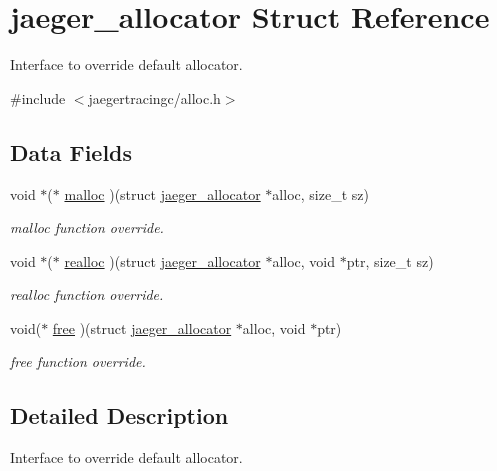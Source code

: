 \hypertarget{structjaeger__allocator}{}\section{jaeger\+\_\+allocator Struct Reference}
\label{structjaeger__allocator}


Interface to override default allocator.  




{\ttfamily \#include $<$jaegertracingc/alloc.\+h$>$}

\subsection*{Data Fields}
\begin{DoxyCompactItemize}
\item 
void $\ast$($\ast$ \mbox{\hyperlink{structjaeger__allocator_a235caded5cb561736c69c28b47169864}{malloc}} )(struct \mbox{\hyperlink{structjaeger__allocator}{jaeger\+\_\+allocator}} $\ast$alloc, size\+\_\+t sz)
\begin{DoxyCompactList}\small\item\em malloc function override. \end{DoxyCompactList}\item 
void $\ast$($\ast$ \mbox{\hyperlink{structjaeger__allocator_a17a8373babb00b98a1303cafaf524676}{realloc}} )(struct \mbox{\hyperlink{structjaeger__allocator}{jaeger\+\_\+allocator}} $\ast$alloc, void $\ast$ptr, size\+\_\+t sz)
\begin{DoxyCompactList}\small\item\em realloc function override. \end{DoxyCompactList}\item 
void($\ast$ \mbox{\hyperlink{structjaeger__allocator_a740ff44da0e720a728593e26bf58acc4}{free}} )(struct \mbox{\hyperlink{structjaeger__allocator}{jaeger\+\_\+allocator}} $\ast$alloc, void $\ast$ptr)
\begin{DoxyCompactList}\small\item\em free function override. \end{DoxyCompactList}\end{DoxyCompactItemize}


\subsection{Detailed Description}
Interface to override default allocator. 



